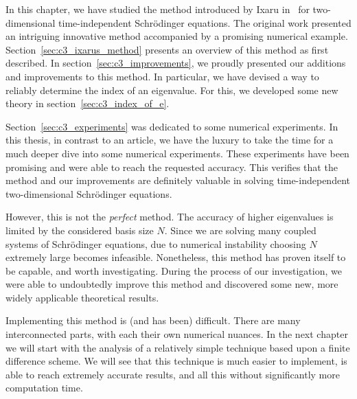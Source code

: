 In this chapter, we have studied the method introduced by Ixaru in~\cite{ixaru_new_2010} for two-dimensional time-independent Schrödinger equations. The original work presented an intriguing innovative method accompanied by a promising numerical example. Section~\ref{sec:c3_ixarus_method} presents an overview of this method as first described. In section~\ref{sec:c3_improvements}, we proudly presented our additions and improvements to this method. In particular, we have devised a way to reliably determine the index of an eigenvalue. For this, we developed some new theory in section~\ref{sec:c3_index_of_e}.

Section~\ref{sec:c3_experiments} was dedicated to some numerical experiments. In this thesis, in contrast to an article, we have the luxury to take the time for a much deeper dive into some numerical experiments. These experiments have been promising and were able to reach the requested accuracy. This verifies that the method and our improvements are definitely valuable in solving time-independent two-dimensional Schrödinger equations.

However, this is not the \emph{perfect} method. The accuracy of higher eigenvalues is limited by the considered basis size $N$. Since we are solving many coupled systems of Schrödinger equations, due to numerical instability choosing $N$ extremely large becomes infeasible. Nonetheless, this method has proven itself to be capable, and worth investigating. During the process of our investigation, we were able to undoubtedly improve this method and discovered some new, more widely applicable theoretical results.

Implementing this method is (and has been) difficult. There are many interconnected parts, with each their own numerical nuances. In the next chapter we will start with the analysis of a relatively simple technique based upon a finite difference scheme. We will see that this technique is much easier to implement, is able to reach extremely accurate results, and all this without significantly more computation time.

\stopchapter
